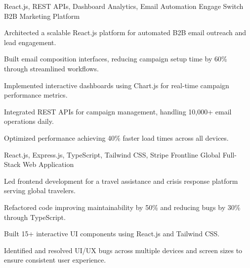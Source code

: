 \newpage
{}


\begin{cventries}

  \cventry
    {React.js, REST APIs, Dashboard Analytics, Email Automation} %
    {Engage Switch} %
    {B2B Marketing Platform} %
    {}
    {
      \begin{cvitems} %
        \item {Architected a scalable React.js platform for automated B2B email outreach and lead engagement.}
        \item {Built email composition interfaces, reducing campaign setup time by 60\% through streamlined workflows.}
        \item {Implemented interactive dashboards using Chart.js for real-time campaign performance metrics.}
        \item {Integrated REST APIs for campaign management, handling 10,000+ email operations daily.}
        \item {Optimized performance achieving 40\% faster load times across all devices.}
      \end{cvitems}
    }

  \cventry
    {React.js, Express.js, TypeScript, Tailwind CSS, Stripe} %
    {Frontline Global} %
    {Full-Stack Web Application}
    {}
    {
      \begin{cvitems} %
        \item {Led frontend development for a travel assistance and crisis response platform serving global travelers.}
        \item {Refactored code improving maintainability by 50\% and reducing bugs by 30\% through TypeScript.}
        \item {Built 15+ interactive UI components using React.js and Tailwind CSS.}
\item {Identified and resolved UI/UX bugs across multiple devices and screen sizes to ensure consistent user experience.}
      \end{cvitems}
    }


\end{cventries}
